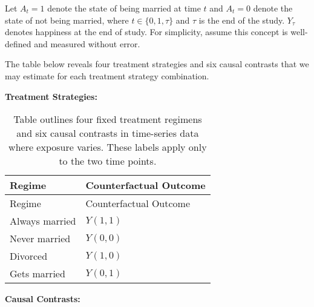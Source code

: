 \documentclass[
  single column]{article}
\begin{document}
Let \(A_t = 1\) denote the state of being married at time \(t\) and
\(A_t = 0\) denote the state of not being married, where
\(t \in \{0, 1, \tau\}\) and \(\tau\) is the end of the study.
\(Y_\tau\) denotes happiness at the end of study. For simplicity, assume
this concept is well-defined and measured without error.

The table below reveals four treatment strategies and six causal
contrasts that we may estimate for each treatment strategy combination.

\textbf{Treatment Strategies:}

\begin{longtable}[]{@{}ll@{}}
\caption{Table outlines four fixed treatment regimens and six causal
contrasts in time-series data where exposure varies. These labels apply
only to the two time
points.}\label{tbl-regimens-marriage}\tabularnewline
\toprule\noalign{}
Regime & Counterfactual Outcome \\
\midrule\noalign{}
\endfirsthead
\toprule\noalign{}
Regime & Counterfactual Outcome \\
\midrule\noalign{}
\endhead
\bottomrule\noalign{}
\endlastfoot
Always married & \(Y(1,1)\) \\
Never married & \(Y(0,0)\) \\
Divorced & \(Y(1,0)\) \\
Gets married & \(Y(0,1)\) \\
\end{longtable}

\textbf{Causal Contrasts:}
\end{document}
